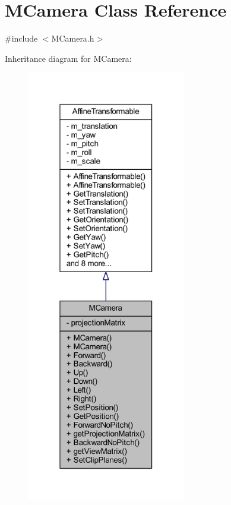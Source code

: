 \hypertarget{class_m_camera}{}\section{M\+Camera Class Reference}
\label{class_m_camera}


{\ttfamily \#include $<$M\+Camera.\+h$>$}



Inheritance diagram for M\+Camera\+:\nopagebreak
\begin{figure}[H]
\begin{center}
\leavevmode
\includegraphics[width=196pt]{class_m_camera__inherit__graph}
\end{center}
\end{figure}


